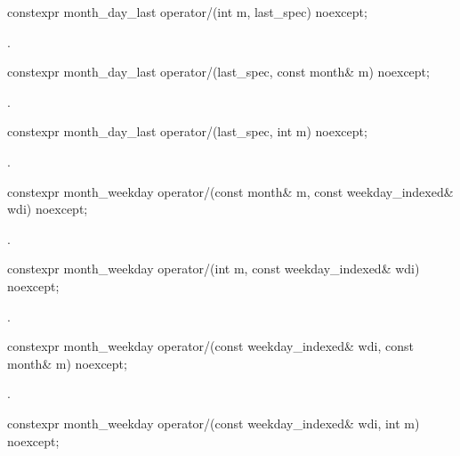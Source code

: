 \begin{itemdecl}
constexpr month_day_last
  operator/(int m, last_spec) noexcept;
\end{itemdecl}

\begin{itemdescr}
\pnum
\returns
{}.
\end{itemdescr}

\begin{itemdecl}
constexpr month_day_last
  operator/(last_spec, const month& m) noexcept;
\end{itemdecl}

\begin{itemdescr}
\pnum
\returns
{}.
\end{itemdescr}

\begin{itemdecl}
constexpr month_day_last
  operator/(last_spec, int m) noexcept;
\end{itemdecl}

\begin{itemdescr}
\pnum
\returns
{}.
\end{itemdescr}

\begin{itemdecl}
constexpr month_weekday
  operator/(const month& m, const weekday_indexed& wdi) noexcept;
\end{itemdecl}

\begin{itemdescr}
\pnum
\returns
{}.
\end{itemdescr}

\begin{itemdecl}
constexpr month_weekday
  operator/(int m, const weekday_indexed& wdi) noexcept;
\end{itemdecl}

\begin{itemdescr}
\pnum
\returns
{}.
\end{itemdescr}

\begin{itemdecl}
constexpr month_weekday
  operator/(const weekday_indexed& wdi, const month& m) noexcept;
\end{itemdecl}

\begin{itemdescr}
\pnum
\returns
{}.
\end{itemdescr}

\begin{itemdecl}
constexpr month_weekday
  operator/(const weekday_indexed& wdi, int m) noexcept;
\end{itemdecl}

